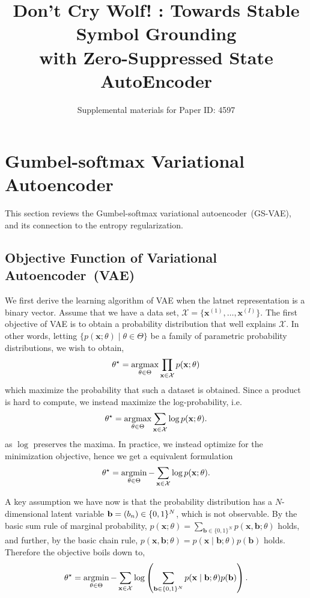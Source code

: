 \documentclass[10pt,letterpaper]{article}
\author{Supplemental materials for Paper ID: 4597}
\title{Don't Cry Wolf! : Towards Stable Symbol Grounding\\ with Zero-Suppressed State AutoEncoder}
\newcommand{\argmin}{\mathop{\rm argmin}}
\newcommand{\argmax}{\mathop{\rm argmax}}
\begin{document}
\maketitle

\section{Gumbel-softmax Variational Autoencoder}
\label{gumbel-softmax-theory}
This section reviews the Gumbel-softmax variational autoencoder~(GS-VAE), and its connection to the entropy regularization.

\subsection{Objective Function of Variational Autoencoder~(VAE)}
We first derive the learning algorithm of VAE when the latnet representation is a binary vector.
Assume that we have a data set, $\mathcal{X}=\{\mathbf{x}^{(1)},\dots,\mathbf{x}^{(I)}\}$.
The first objective of VAE is to obtain a probability distribution that well explains $\mathcal{X}$.
In other words, letting $\{p(\mathbf{x};\theta) \mid \theta\in\Theta\}$ be a family of parametric probability distributions, we wish to obtain,
\begin{align*}
\theta^\star = \argmax_{\theta\in\Theta} \prod_{\mathbf{x}\in \mathcal{X}} p(\mathbf{x};\theta)
\end{align*}
which maximize the probability that such a dataset is obtained. Since a product is hard to compute, we instead maximize the log-probability, i.e.
\begin{align*}
\theta^\star = \argmax_{\theta\in\Theta} \sum_{\mathbf{x}\in \mathcal{X}} \log p(\mathbf{x};\theta).
\end{align*}
as $\log$ preserves the maxima.
In practice, we instead optimize for the minimization objective, hence we get a equivalent formulation
\begin{align*}
\theta^\star = \argmin_{\theta\in\Theta} - \sum_{\mathbf{x}\in \mathcal{X}} \log p(\mathbf{x};\theta).
\end{align*}


A key assumption we have now is that the probability distribution has a $N$-dimensional latent variable $\mathbf{b}={\left(b_n\right)}\in\{0,1\}^N$, which is not observable.
By the basic sum rule of marginal probability,
$p(\mathbf{x};\theta) = \sum_{\mathbf{b}\in\{0,1\}^N}p(\mathbf{x}, \mathbf{b};\theta)$ holds, and further,
by the basic chain rule,
$p(\mathbf{x}, \mathbf{b};\theta) = p(\mathbf{x} \mid \mathbf{b};\theta)p(\mathbf{b})$ holds.
Therefore the objective boils down to,
\begin{align}
\label{eq:vae-obj} \theta^\star = \argmin_{\theta\in\Theta} -\sum_{\mathbf{x}\in \mathcal{X}} \log \left(\sum_{\mathbf{b}\in\{0,1\}^N}p(\mathbf{x} \mid \mathbf{b};\theta)p(\mathbf{b})\right).
\end{align}
\end{document}
